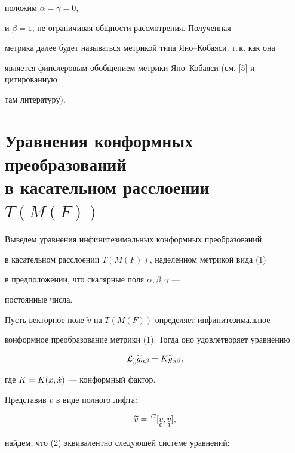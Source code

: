 положим $\alpha = \gamma = 0$,


и $\beta = 1$, не ограничивая общности рассмотрения. Полученная


метрика далее будет называться метрикой типа Яно--Кобаяси, т.\,к. как она


является финслеровым обобщением метрики Яно--Кобаяси (см. [5] и цитированную


там литературу).








\section{Уравнения конформных преобразований\protect\\


в касательном расслоении $T(M(F))$}





Выведем уравнения инфинитезимальных конформных преобразований


в касательном расслоении $T(M(F))$, наделенном метрикой вида (1)


в предположении, что скалярные поля $\alpha ,\beta ,\gamma $ ---


постоянные числа.


Пусть векторное поле $\widetilde{v}$ на $T(M(F))$ определяет инфинитезимальное


конформное преобразование метрики (1). Тогда оно удовлетворяет уравнению


\begin{equation}


{\lie}_{\widetilde{v}}


{\widetilde g}_{\alpha \beta} = K{\widetilde g}_{\alpha \beta},


\end{equation}


где $K = K(x,\Dot x)$ --- конформный фактор.


Представив $\widetilde{v}$ в виде полного лифта:


$$


\widetilde{v} =\,{}^{G}[\sd{v}{0},\sd{v}{1}],


$$


найдем, что (2) эквивалентно следующей системе уравнений:


